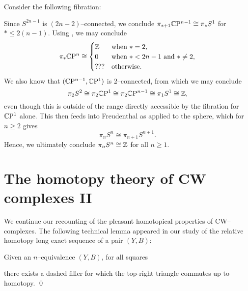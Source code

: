 \begin{example}\label{PinSnWithoutHurewicz}%
Consider the following fibration:%
\begin{center}
\end{center}
Since $S^{2n-1}$ is $(2n-2)$--connected, we conclude $\pi_{*+1} \mathbb C \mathrm{P}^{n-1} \cong \pi_* S^1$ for $* \le 2(n-1)$.
Using , we may conclude \[\pi_* \mathbb C \mathrm{P}^n \cong \begin{cases} \mathbb Z & \text{when $* = 2$}, \\ 0 & \text{when $* < 2n-1$ and $* \ne 2$}, \\ ??? & \text{otherwise}. \end{cases}\]
We also know that $(\mathbb C \mathrm{P}^{n-1}, \mathbb C \mathrm{P}^1)$ is $2$--connected, from which we may conclude
\[\pi_2 S^2 \cong \pi_2 \mathbb C \mathrm{P}^1 \cong \pi_2 \mathbb C \mathrm{P}^{n-1} \cong \pi_1 S^1 \cong \mathbb Z,\]
even though this is outside of the range directly accessible by the fibration for $\mathbb C \mathrm{P}^1$ alone.
This then feeds into Freudenthal as applied to the sphere, which for $n \ge 2$ gives \[\pi_n S^n \cong \pi_{n+1} S^{n+1}.\]
Hence, we ultimately conclude $\pi_n S^n \cong \mathbb Z$ for all $n \ge 1$.
\end{example}




\section{The homotopy theory of CW complexes II}

We continue our recounting of the pleasant homotopical properties of CW--complexes.
The following technical lemma appeared in our study of the relative homotopy long exact sequence of a pair $(Y, B)$:
\begin{lemma}
Given an $n$--equivalence $(Y, B)$, for all squares
\begin{center}
\end{center}
there exists a dashed filler for which the top-right triangle commutes up to homotopy. \qed
{}
\end{lemma}


